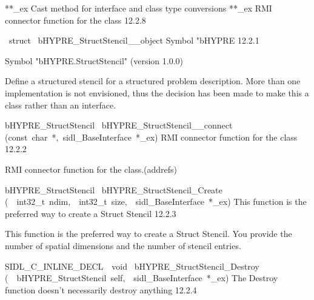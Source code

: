 \documentclass{article}
\begin{document}
\begin{cxxentry}
\begin{cxxentry}
\begin{cxxnames}
        {**\_ex}
        {}
        {
Cast method for interface and class type conversions}
        {}
\label{cxx.12.2.19}
        {**\_ex}
        {}
        {
RMI connector function for the class}
        {12.2.8}
\end{cxxnames}
\begin{cxxvariable}
{\ struct\ }
        {bHYPRE\_StructStencil\_\_object}
        {}
        {
Symbol "bHYPRE}
        {12.2.1}
\begin{cxxdoc}

Symbol "bHYPRE.StructStencil" (version 1.0.0)

Define a structured stencil for a structured problem
description.  More than one implementation is not envisioned,
thus the decision has been made to make this a class rather than
an interface.
\end{cxxdoc}
\end{cxxvariable}
\begin{cxxfunction}
{bHYPRE\_StructStencil\ }
        {bHYPRE\_StructStencil\_\_connect}
        {(const\ char\ *,\ sidl\_BaseInterface\ *\_ex)}
        {
RMI connector function for the class}
        {12.2.2}
\begin{cxxdoc}

RMI connector function for the class.(addrefs)
\end{cxxdoc}
\end{cxxfunction}
\begin{cxxfunction}
{bHYPRE\_StructStencil\ }
        {bHYPRE\_StructStencil\_Create}
        {(\ \ int32\_t\ ndim,\ \ int32\_t\ size,\ \ sidl\_BaseInterface\ *\_ex)}
        {
This function is the preferred way to create a Struct Stencil}
        {12.2.3}
\begin{cxxdoc}

This function is the preferred way to create a Struct Stencil.
You provide the number of spatial dimensions and the number of
stencil entries.  
\end{cxxdoc}
\end{cxxfunction}
\begin{cxxfunction}
{SIDL\_C\_INLINE\_DECL\ \ void\ }
        {bHYPRE\_StructStencil\_Destroy}
        {(\ \ bHYPRE\_StructStencil\ self,\ \ sidl\_BaseInterface\ *\_ex)}
        {
The Destroy function doesn't necessarily destroy anything}
        {12.2.4}
\begin{cxxdoc}


\end{cxxdoc}
\end{cxxfunction}
\end{cxxentry}
\end{cxxentry}
\end{document}
